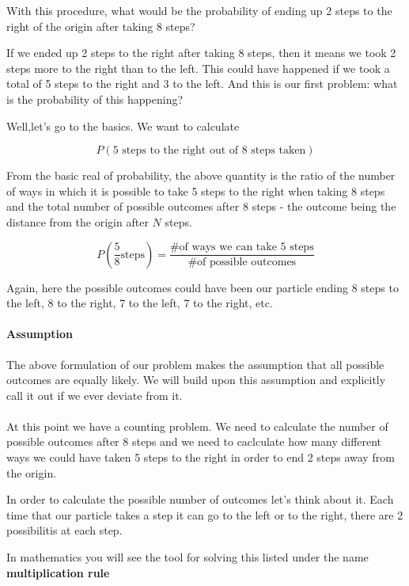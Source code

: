 With this procedure, what would be the probability of ending up 2 steps to the right of the origin after taking 8 steps?

If we ended up 2 steps to the right after taking 8 steps, then it means we took 2 steps more to the right than to the left.
This could have happened if we took a total of 5 steps to the right and 3 to the left.
And this is our first problem: what is the probability of this happening?

Well,let's go to the basics.
We want to calculate

$$
P \left( \mbox{5 steps to the right out of 8 steps taken} \right)
$$

From the basic real of probability, the above quantity is the ratio of the number of ways in which it is possible to take 5 steps to the right when taking 8 steps and the total number of possible outcomes after 8 steps - the outcome being the distance from the origin after $N$ steps.

\begin{equation}
P \left( \frac{5}{8} \mbox{steps} \right) 
= \frac{\mbox{\# of ways we can take 5 steps}}{\mbox{\# of possible outcomes}} \label{eq:coin-probability}
\end{equation}

Again, here the possible outcomes could have been our particle ending 8 steps to the left, 8 to the right, 7 to the left, 7 to the right, etc.

\paragraph{Assumption} The above formulation of our problem makes the assumption that all possible outcomes are equally likely. We will build upon this assumption and explicitly call it out if we ever deviate from it.
\\~\\

At this point we have a counting problem.
We need to calculate the number of possible outcomes after 8 steps and we need to caclculate how many different ways we could have taken 5 steps to the right in order to end 2 steps away from the origin.

In order to calculate the possible number of outcomes let's think about it.
Each time that our particle takes a step it can go to the left or to the right, there are 2 possibilitis at each step.

In mathematics you will see the tool for solving this listed under the name \textbf{multiplication rule}

